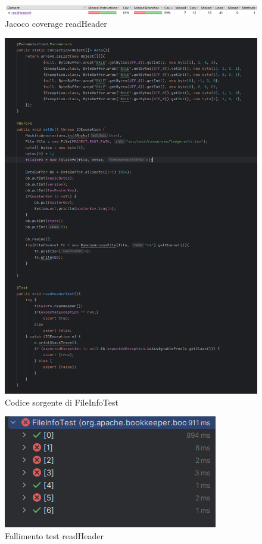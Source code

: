 \documentclass[12pt, a4paper]{article}
\begin{document}
  \begin{figure}
    \includegraphics[width=\linewidth]{./images/file_info/JacocoCoveragereadHeader1.png}
    \caption{Jacoco coverage readHeader}
    \label{fig:JacocoCoveragereadHeader1}
  \end{figure}
  \begin{figure}
    \includegraphics[width=\linewidth]{./images/file_info/Code1ReadHeader.png}
    \caption{Codice sorgente di FileInfoTest}
    \label{fig:Code1ReadHeader}
  \end{figure}

  \begin{figure}
    \includegraphics[width=\linewidth]{./images/file_info/TestFailsReadHeader.png}
    \caption{Fallimento test readHeader}
    \label{fig:TestFailsReadHeader}
  \end{figure}  
\end{document}
